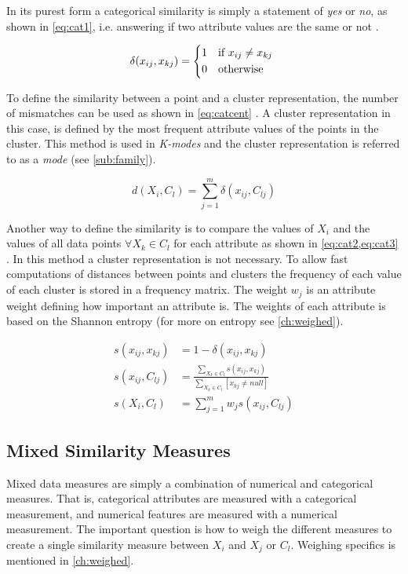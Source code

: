 \documentclass[../report.tex]{subfiles}
\begin{document}
In its purest form a categorical similarity is simply a statement of \textit{yes} or \textit{no}, as shown in \cref{eq:cat1}, i.e. answering if two attribute values are the same or not \cite{Guha2000, Kaufman1990}.


\begin{equation}
\label{eq:cat1}
\delta{(x_{ij},x_{kj})} =
  \begin{cases*}
  1 & if $x_{ij} \neq x_{kj}$ \\
    0 & otherwise
  \end{cases*}
\end{equation}

To define the similarity between a point and a cluster representation, the number of mismatches can be used as shown in \cref{eq:catcent} \cite{Ng1999,Huang97clusteringlarge}. A cluster representation in this case, is defined by the most frequent attribute values of the points in the cluster. This method is used in \textit{K-modes} and the cluster representation is referred to as a \textit{mode} \cite{Ng1999} (see \cref{sub:family}).

\begin{equation}
\label{eq:catcent}
d(X_{i},C_l) = \sum^{m}_{j=1}\delta(x_{ij},C_{lj})
\end{equation}

Another way to define the similarity is to compare the values of $X_i$ and the values of all data points $\forall X_k \in C_l$ for each attribute as shown in \cref{eq:cat2,eq:cat3} \cite{Guha2000, Cheung2013}. In this method a cluster representation is not necessary. To allow fast computations of distances between points and clusters the frequency of each value of each cluster is stored in a frequency matrix. The weight $w_j$ is an attribute weight defining how important an attribute is. The weights of each attribute is based on the Shannon entropy (for more on entropy see \cref{ch:weighed}).

\begin{align}
s(x_{ij},x_{kj}) &= 1 - \delta{(x_{ij},x_{kj})} \\
\label{eq:cat2}
s(x_{ij},C_{lj}) &= \frac{\sum_{X_k \in C_{l}}{s(x_{ij},x_{kj})}}{\sum_{X_k \in C_{l} }{[ x_{kj} \neq null ]}} \\
\label{eq:cat3}
s(X_{i},C_{l}) &= \sum_{j = 1}^{m}{w_j s(x_{ij},C_{lj})}
\end{align}

\subsection{Mixed Similarity Measures} \label{sssec:mixed-sim}
Mixed data measures are simply a combination of numerical and categorical measures. That is, categorical attributes are measured with a categorical measurement, and numerical features are measured with a numerical measurement. The important question is how to weigh the different measures to create a single similarity measure between $X_i$ and $X_j$ or $C_l$. Weighing specifics is mentioned in \cref{ch:weighed}.
\end{document}
